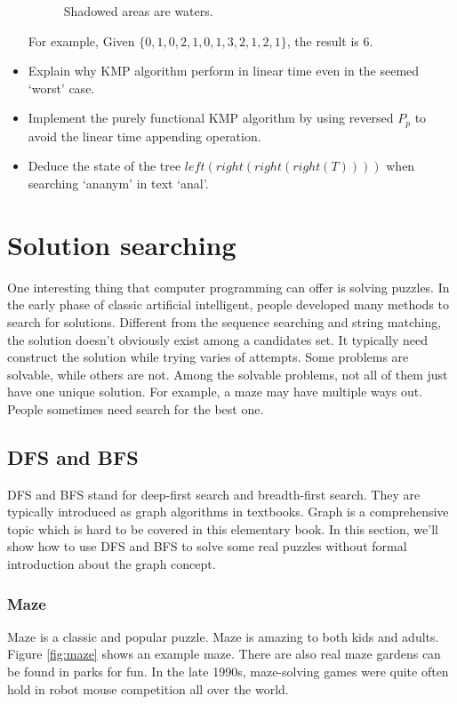 \documentclass[UTF8]{article}
\begin{document}
\begin{Exercise}
\begin{itemize}
\begin{figure}[htbp]
 \caption{Shadowed areas are waters.}
 \label{fig:rain-fill}
\end{figure}
For example, Given $\{0,1,0,2,1,0,1,3,2,1,2,1\}$, the result is 6.
\item Explain why KMP algorithm perform in linear time even in the seemed `worst' case.
\item Implement the purely functional KMP algorithm by using reversed $P_p$ to avoid the linear time appending operation.
\item Deduce the state of the tree $left(right(right(right(T))))$ when searching `ananym' in text `anal'.
\end{itemize}
\end{Exercise}

\section{Solution searching}

One interesting thing that computer programming can offer is solving puzzles. In the early phase of classic
artificial intelligent, people developed many methods to search for solutions. Different from the sequence
searching and string matching, the solution doesn't obviously exist among a candidates set. It typically
need construct the solution while trying varies of attempts. Some problems are solvable, while others are not.
Among the solvable problems, not all of them just have one unique solution. For example, a maze may have multiple
ways out. People sometimes need search for the best one.

\subsection{DFS and BFS}
 
DFS and BFS stand for deep-first search and breadth-first search. They are typically introduced as graph algorithms
in textbooks. Graph is a comprehensive topic which is hard to be covered in this elementary book. In this section,
we'll show how to use DFS and BFS to solve some real puzzles without formal introduction about the graph concept.

\subsubsection{Maze}
Maze is a classic and popular puzzle. Maze is amazing to both kids and adults.
Figure \ref{fig:maze} shows an example maze. There are also real maze gardens can be found in
parks for fun. In the late 1990s, maze-solving games were quite often hold in robot mouse competition
all over the world.
\end{document}
